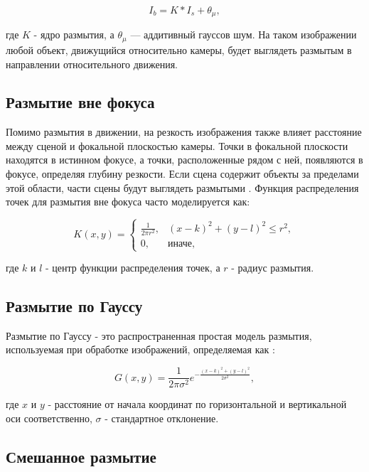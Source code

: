 \begin{equation}
	I_{b} = K * I_{s} + \theta_{\mu},
\end{equation}

где \(K\) - ядро размытия, а \(\theta_{\mu}\) — аддитивный гауссов шум. На таком изображении любой объект, движущийся относительно камеры, будет выглядеть размытым в направлении относительного движения.

\subsection{Размытие вне фокуса}

Помимо размытия в движении, на резкость изображения также влияет расстояние между сценой и фокальной плоскостью камеры. Точки в фокальной плоскости находятся в истинном фокусе, а точки, расположенные рядом с ней, появляются в фокусе, определяя глубину резкости. Если сцена содержит объекты за пределами этой области, части сцены будут выглядеть размытыми \cite{zhang2020deblurring}. Функция распределения точек для размытия вне фокуса часто моделируется как:

\begin{equation}\label{eq:deblurring}
	K(x, y) = \begin{cases}
		\frac{1}{2 \pi r^2}, & (x - k)^2 + (y - l)^2 \leq r^2, \\
		0, & \text{иначе},
	\end{cases}
\end{equation}

где \(k\) и \(l\) - центр функции распределения точек, а \(r\) - радиус размытия.

\subsection{Размытие по Гауссу}

Размытие по Гауссу - это распространенная простая модель размытия, используемая при обработке изображений, определяемая как \cite{chen2009empirical}:

\begin{equation}
	G(x, y) = \frac{1}{2 \pi \sigma^2} e^{-\frac{(x - k)^2 + (y - l)^2}{2 \sigma^2}},
\end{equation}

где \(x\) и \(y\) - расстояние от начала координат по горизонтальной и вертикальной оси соответственно, \(\sigma\) - стандартное отклонение.


\subsection{Смешанное размытие}

